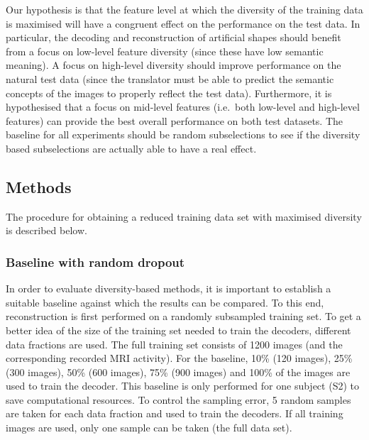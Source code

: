 Our hypothesis is that the feature level at which the diversity of the training data is maximised will have a congruent effect on the performance on the test data. In particular, the decoding and reconstruction of artificial shapes should benefit from a focus on low-level feature diversity (since these have low semantic meaning). A focus on high-level diversity should improve performance on the natural test data (since the translator must be able to predict the semantic concepts of the images to properly reflect the test data). Furthermore, it is hypothesised that a focus on mid-level features (i.e.\ both low-level and high-level features) can provide the best overall performance on both test datasets. The baseline for all experiments should be random subselections to see if the diversity based subselections are actually able to have a real effect.



\subsection{Methods}

The procedure for obtaining a reduced training data set with maximised diversity is described below.

\subsubsection{Baseline with random dropout}

In order to evaluate diversity-based methods, it is important to establish a suitable baseline against which the results can be compared. To this end, reconstruction is first performed on a randomly subsampled training set. To get a better idea of the size of the training set needed to train the decoders, different data fractions are used. The full training set consists of 1200 images (and the corresponding recorded MRI activity). For the baseline, 10\% (120 images), 25\% (300 images), 50\% (600 images), 75\% (900 images) and 100\% of the images are used to train the decoder. This baseline is only performed for one subject (S2) to save computational resources. To control the sampling error, 5 random samples are taken for each data fraction and used to train the decoders. If all training images are used, only one sample can be taken (the full data set). 

